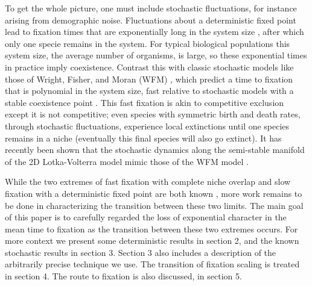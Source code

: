 \documentclass[a4paper,10pt]{article}
\numberwithin{equation}{section} %
\begin{document}
To get the whole picture, one must include stochastic fluctuations, for instance arising from demographic noise. 
Fluctuations about a deterministic fixed point lead to fixation times that are exponentially long in the system size \cite{Ovaskainen2010}, after which only one specie remains in the system. 
For typical biological populations this system size, the average number of organisms, is large, so these exponential times in practice imply coexistence. 
Contrast this with classic stochastic models like those of Wright, Fisher, and Moran (WFM) \cite{Wright1931,Fisher1930,Moran1962}, which predict a time to fixation that is polynomial in the system size, fast relative to stochastic models with a stable coexistence point \cite{Moran1962,Kimura1968}. 
This fast fixation is akin to competitive exclusion except it is not competitive; even species with symmetric birth and death rates, through stochastic fluctuations, experience local extinctions until one species remains in a niche \cite{Wright1931,Fisher1930,Moran1962,Kimura1968,Stirk2010,Capitan2017} (eventually this final species will also go extinct). %
It has recently been shown that the stochastic dynamics along the semi-stable manifold of the 2D Lotka-Volterra model mimic those of the WFM model \cite{Lin2012,Constable2015}. 

While the two extremes of fast fixation with complete niche overlap and slow fixation with a deterministic fixed point are both known \cite{Dobrinevski2012,Gabel2013,Chotibut2015,Fisher2014,Constable2015,Lin2012}, more work remains to be done in characterizing the transition between these two limits. 
The main goal of this paper is to carefully regarded the loss of exponential character in the mean time to fixation as the transition between these two extremes occurs. 
For more context we present some deterministic results in section 2, and the known stochastic results in section 3. 
Section 3 also includes a description of the arbitrarily precise technique we use. 
The transition of fixation scaling is treated in section 4. 
The route to fixation is also discussed, in section 5. 
\end{document}
